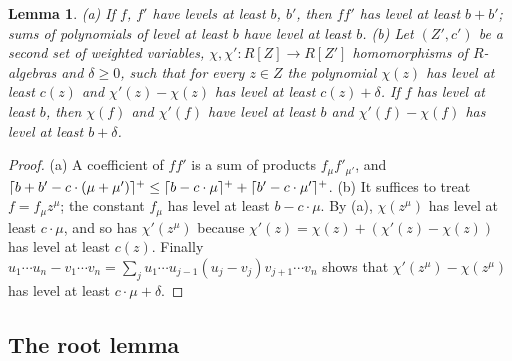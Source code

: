 \documentclass[10pt]{amsart}
\newtheorem{lemma}[theorem]{Lemma}
\theoremstyle{definition}
\theoremstyle{remark}
\begin{document}
\begin{lemma}\label{pe:lev}
{\rm(a)} If $f$, $f'$ have levels at least $b$, $b'$, then $ff'$ has level at least $b+b'$; sums of
polynomials of level at least $b$ have level at least $b$. {\rm(b)} Let $(Z',c')$ be a second set
of weighted variables, $\chi,\chi'\colon R[Z]\to R[Z']$ homomorphisms of $R$-algebras and
$\delta\ge0$, such that for every $z\in Z$ the polynomial $\chi(z)$ has level at least $c(z)$ and
$\chi'(z)-\chi(z)$ has level at least $c(z)+\delta$. If $f$ has level at least $b$, then $\chi(f)$
and $\chi'(f)$ have level at least $b$ and $\chi'(f)-\chi(f)$ has level at least $b+\delta$.
\end{lemma}
\begin{proof}
(a) A coefficient of $ff'$ is a sum of products $f_\mu f'_{\mu'}$, and
$\lceil b+b'-c\cdot(\mu+\mu')\rceil^{+}\le\lceil b-c\cdot\mu\rceil^{+}+\lceil b'-c\cdot\mu'\rceil^{+}$. (b) It suffices to treat
$f=f_\mu z^\mu$; the constant $f_\mu$ has level at least $b-c\cdot\mu$. By (a), $\chi(z^\mu)$ has
level at least $c\cdot\mu$, and so has $\chi'(z^\mu)$ because $\chi'(z)=\chi(z)+(\chi'(z)-\chi(z))$
has level at least $c(z)$. Finally $u_1\cdots u_n-v_1\cdots v_n=\sum_ju_1\cdots u_{j-1}(u_j-v_j)
v_{j+1}\cdots v_n$ shows that $\chi'(z^\mu)-\chi(z^\mu)$ has level at least $c\cdot\mu+\delta$.
\end{proof}

\subsection{The root lemma}\label{pe:ss-root}
\end{document}
